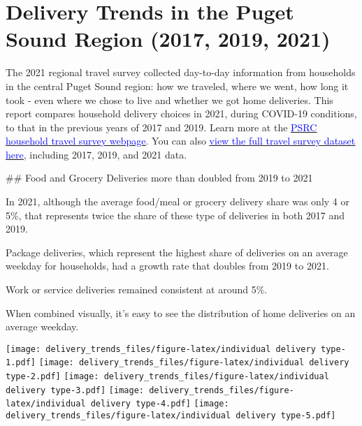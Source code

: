 \documentclass[
  12pt,
]{article}
\author{Meg Grzybowski}
\date{2022-12-29}
\begin{document}
\setmainfont{Poppins}

\hypertarget{delivery-trends-in-the-puget-sound-region-2017-2019-2021}{%
\section{Delivery Trends in the Puget Sound Region (2017, 2019,
2021)}\label{delivery-trends-in-the-puget-sound-region-2017-2019-2021}}

\begin{flushleft}
The 2021 regional travel survey collected day-to-day information from households in the central Puget Sound region: how we traveled, where we went, how long it took - even where we chose to live and whether we got home deliveries. This report compares household delivery choices in 2021, during COVID-19 conditions, to that in the previous years of 2017 and 2019. Learn more at the \href{https://www.psrc.org/our-work/household-travel-survey-program}{\underline{\textcolor{blue}{PSRC household travel survey webpage}}}. You can also \href{https://household-travel-survey-psregcncl.hub.arcgis.com}{\underline{\textcolor{blue}{view the full travel survey dataset here}}}, including 2017, 2019, and 2021 data.

## Food and Grocery Deliveries more than doubled from 2019 to 2021
\begin{flushleft}
In 2021, although the average food/meal or grocery delivery share was only 4 or 5\%, 
that represents twice the share of these type of deliveries in both 2017 and 2019.

Package deliveries, which represent the highest share of deliveries on an average weekday
for households, had a growth rate that doubles from 2019 to 2021.

Work or service deliveries remained consistent at around 5\%.

When combined visually, it's easy to see the distribution of home deliveries on an average weekday. 
\end{flushleft}

\texttt{[image: delivery\_trends\_files/figure-latex/individual delivery type-1.pdf]}
\texttt{[image: delivery\_trends\_files/figure-latex/individual delivery type-2.pdf]}
\texttt{[image: delivery\_trends\_files/figure-latex/individual delivery type-3.pdf]}
\texttt{[image: delivery\_trends\_files/figure-latex/individual delivery type-4.pdf]}
\texttt{[image: delivery\_trends\_files/figure-latex/individual delivery type-5.pdf]}

\hypertarget{foodmeal-and-package-deliveries-in-low-and-high-income-households-differed.}{%
}
\end{flushleft}
\end{document}
